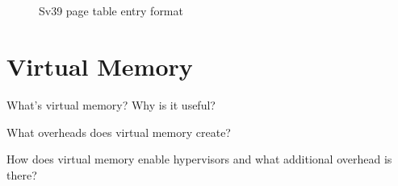 \begin{figure}
	\begin{bytefield}[bitwidth=1.1em]{44}
		\\
		\\
	\end{bytefield}
	\vspace{-.15in}
	\caption{Sv39 page table entry format}
	\label{sv39pte}
\end{figure}

\section{Virtual Memory}

What's virtual memory? Why is it useful?

What overheads does virtual memory create?

How does virtual memory enable hypervisors and what additional overhead is there?

